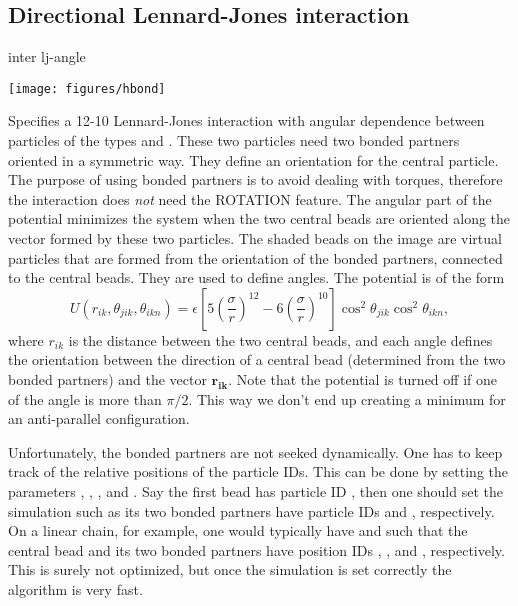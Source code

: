 \subsection{Directional Lennard-Jones interaction}
\begin{essyntax}
  inter   lj-angle
  \var{\epsilon} \var{\sigma}
    
    
  \begin{features}
  \end{features}
\end{essyntax}

\begin{center}
  \texttt{[image: figures/hbond]}
\end{center}

Specifies a 12-10 Lennard-Jones interaction with angular dependence between
particles of the types  and . These two particles need
two bonded partners oriented in a symmetric way. They define an orientation
for the central particle. The purpose of using bonded partners is to avoid
dealing with torques, therefore the interaction does \emph{not} need the
ROTATION feature. The angular part of the potential minimizes the system when
the two central beads are oriented along the vector formed by these two
particles. The shaded beads on the image are virtual particles that are formed
from the orientation of the bonded partners, connected to the central
beads. They are used to define angles. The potential is of the form
\begin{equation}
  U(r_{ik},\theta_{jik},\theta_{ikn})=\epsilon\left[5\left(\frac{\sigma}r\right)^{12}-6\left(\frac{\sigma}{r}\right)^{10}\right]\cos^2\theta_{jik}\cos^2\theta_{ikn},
\end{equation}
where $r_{ik}$ is the distance between the two central beads, and each angle
defines the orientation between the direction of a central bead (determined
from the two bonded partners) and the vector $\mathbf{r_{ik}}$. Note that the
potential is turned off if one of the angle is more than $\pi/2$. This way we
don't end up creating a minimum for an anti-parallel configuration.

Unfortunately, the bonded partners are not seeked dynamically. One has to keep
track of the relative positions of the particle IDs. This can be done by
setting the parameters , , , and . Say
the first bead  has particle ID , then one should set the
simulation such as its two bonded partners have particle IDs  and
, respectively. On a linear chain, for example, one would
typically have  and  such that the central bead and
its two bonded partners have position IDs , , and ,
respectively. This is surely not optimized, but once the simulation is set
correctly the algorithm is very fast.

